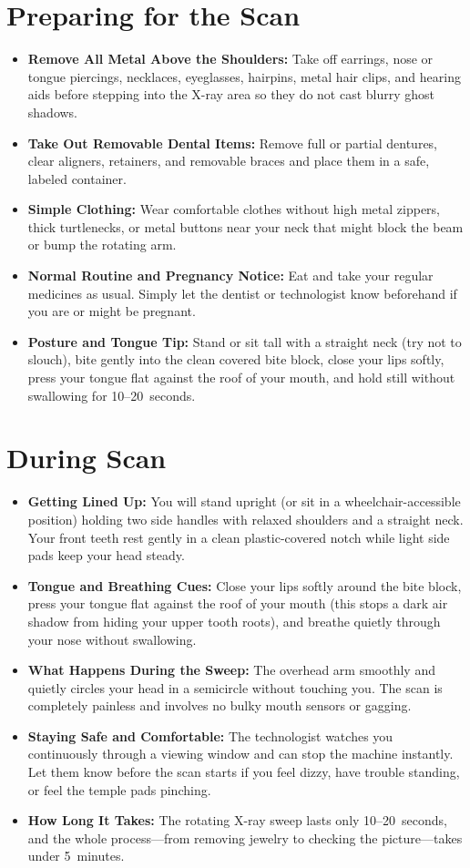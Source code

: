 \section{Preparing for the Scan}
\begin{itemize}
\item \textbf{Remove All Metal Above the Shoulders:} Take off earrings, nose or tongue piercings, necklaces, eyeglasses, hairpins, metal hair clips, and hearing aids before stepping into the X-ray area so they do not cast blurry ghost shadows.
\item \textbf{Take Out Removable Dental Items:} Remove full or partial dentures, clear aligners, retainers, and removable braces and place them in a safe, labeled container.
\item \textbf{Simple Clothing:} Wear comfortable clothes without high metal zippers, thick turtlenecks, or metal buttons near your neck that might block the beam or bump the rotating arm.
\item \textbf{Normal Routine and Pregnancy Notice:} Eat and take your regular medicines as usual. Simply let the dentist or technologist know beforehand if you are or might be pregnant.
\item \textbf{Posture and Tongue Tip:} Stand or sit tall with a straight neck (try not to slouch), bite gently into the clean covered bite block, close your lips softly, press your tongue flat against the roof of your mouth, and hold still without swallowing for 10--20~seconds.
\end{itemize}

\section{During Scan}
\begin{itemize}
\item \textbf{Getting Lined Up:} You will stand upright (or sit in a wheelchair-accessible position) holding two side handles with relaxed shoulders and a straight neck. Your front teeth rest gently in a clean plastic-covered notch while light side pads keep your head steady.
\item \textbf{Tongue and Breathing Cues:} Close your lips softly around the bite block, press your tongue flat against the roof of your mouth (this stops a dark air shadow from hiding your upper tooth roots), and breathe quietly through your nose without swallowing.
\item \textbf{What Happens During the Sweep:} The overhead arm smoothly and quietly circles your head in a semicircle without touching you. The scan is completely painless and involves no bulky mouth sensors or gagging.
\item \textbf{Staying Safe and Comfortable:} The technologist watches you continuously through a viewing window and can stop the machine instantly. Let them know before the scan starts if you feel dizzy, have trouble standing, or feel the temple pads pinching.
\item \textbf{How Long It Takes:} The rotating X-ray sweep lasts only 10--20~seconds, and the whole process---from removing jewelry to checking the picture---takes under 5~minutes.
\end{itemize}

